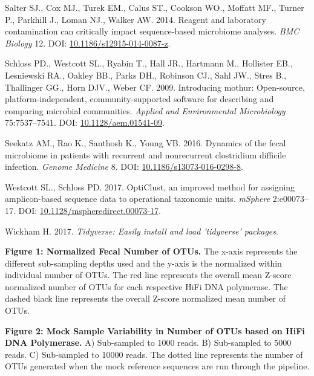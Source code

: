 \documentclass[12pt,]{article}
\begin{document}
\hypertarget{ref-contamination_Salter2014}{}
Salter SJ., Cox MJ., Turek EM., Calus ST., Cookson WO., Moffatt MF.,
Turner P., Parkhill J., Loman NJ., Walker AW. 2014. Reagent and
laboratory contamination can critically impact sequence-based microbiome
analyses. \emph{BMC Biology} 12. DOI:
\href{https://doi.org/10.1186/s12915-014-0087-z}{10.1186/s12915-014-0087-z}.

\hypertarget{ref-mothur_schloss_2009}{}
Schloss PD., Westcott SL., Ryabin T., Hall JR., Hartmann M., Hollister
EB., Lesniewski RA., Oakley BB., Parks DH., Robinson CJ., Sahl JW.,
Stres B., Thallinger GG., Horn DJV., Weber CF. 2009. Introducing mothur:
Open-source, platform-independent, community-supported software for
describing and comparing microbial communities. \emph{Applied and
Environmental Microbiology} 75:7537--7541. DOI:
\href{https://doi.org/10.1128/aem.01541-09}{10.1128/aem.01541-09}.

\hypertarget{ref-erin_seekatz_2016}{}
Seekatz AM., Rao K., Santhosh K., Young VB. 2016. Dynamics of the fecal
microbiome in patients with recurrent and nonrecurrent clostridium
difficile infection. \emph{Genome Medicine} 8. DOI:
\href{https://doi.org/10.1186/s13073-016-0298-8}{10.1186/s13073-016-0298-8}.

\hypertarget{ref-opticlust_Westcott_2017}{}
Westcott SL., Schloss PD. 2017. OptiClust, an improved method for
assigning amplicon-based sequence data to operational taxonomic units.
\emph{mSphere} 2:e00073--17. DOI:
\href{https://doi.org/10.1128/mspheredirect.00073-17}{10.1128/mspheredirect.00073-17}.

\hypertarget{ref-tidyverse_2017}{}
Wickham H. 2017. \emph{Tidyverse: Easily install and load 'tidyverse'
packages}.

\newpage

\textbf{Figure 1: Normalized Fecal Number of OTUs.} The x-axis
represents the different sub-sampling depths used and the y-axis is the
normalized within individual number of OTUs. The red line represents the
overall mean Z-score normalized number of OTUs for each respective HiFi
DNA polymerase. The dashed black line represents the overall Z-score
normalized mean number of OTUs.

\textbf{Figure 2: Mock Sample Variability in Number of OTUs based on
HiFi DNA Polymerase.} A) Sub-sampled to 1000 reads. B) Sub-sampled to
5000 reads. C) Sub-sampled to 10000 reads. The dotted line represents
the number of OTUs generated when the mock reference sequences are run
through the pipeline.
\end{document}
